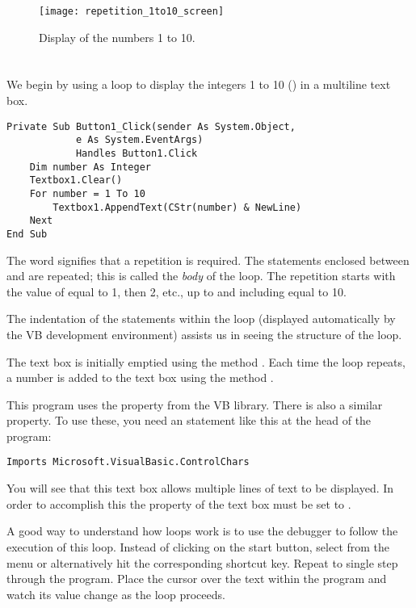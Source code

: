 		\begin{figure}[th]
			\centering
			\texttt{[image: repetition\_1to10\_screen]}
			\caption{Display of the numbers 1 to 10.}
			\label{fig:repetition_1to10_screen}
		\end{figure}


	\section{}
		We begin by using a loop to display the integers 1 to 10 () in a multiline text box.
		\begin{lstlisting}
Private Sub Button1_Click(sender As System.Object,
			e As System.EventArgs)
			Handles Button1.Click
	Dim number As Integer
	Textbox1.Clear()
	For number = 1 To 10
		Textbox1.AppendText(CStr(number) & NewLine)
	Next
End Sub
		\end{lstlisting}
		The word  signifies that a repetition is required. The statements enclosed between  and  are repeated; this is called the \emph{body} of the loop. The repetition starts with the value of  equal to 1, then 2, etc., up to and including  equal to 10. 

		The indentation of the statements within the loop (displayed automatically by the VB development environment) assists us in seeing the structure of the loop.
		
		The text box is initially emptied using the method . Each time the loop repeats, a number is added to the text box using the method .
		
		This program uses the  property from the VB library. There is also a similar  property. To use these, you need an  statement like this at the head of the program:
		\begin{lstlisting}
Imports Microsoft.VisualBasic.ControlChars
		\end{lstlisting}
		You will see that this text box allows multiple lines of text to be displayed. In order to accomplish this the  property of the text box must be set to .

		A good way to understand how loops work is to use the debugger to follow the execution of this loop. Instead of clicking on the start button, select  from the  menu or alternatively hit the corresponding shortcut key. Repeat to single step through the program. Place the cursor over the text  within the program and watch its value change as the loop proceeds.
		
